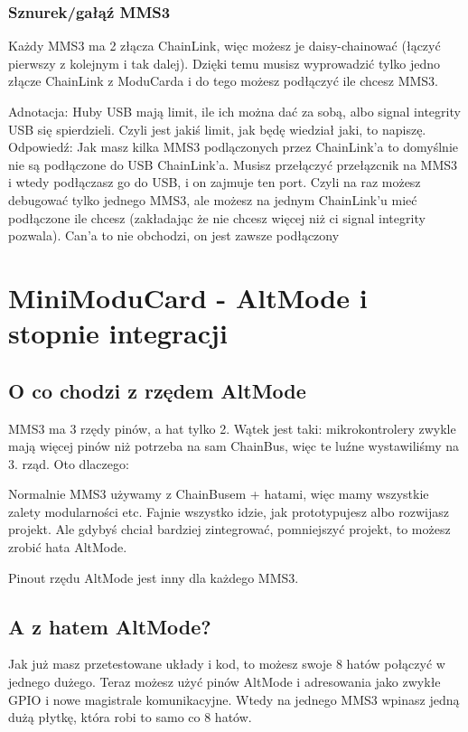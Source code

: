 \documentclass[b5paper, 10pt, twoside]{book}
\begin{document}
\subsubsection{Sznurek/gałąź MMS3}
Każdy MMS3 ma 2 złącza ChainLink, więc możesz je daisy-chainować (łączyć pierwszy z kolejnym i tak dalej). Dzięki temu musisz wyprowadzić tylko jedno złącze ChainLink z ModuCarda i do tego możesz podłączyć ile chcesz MMS3.

Adnotacja: Huby USB mają limit, ile ich można dać za sobą, albo signal integrity USB się spierdzieli. Czyli jest jakiś limit, jak będę wiedział jaki, to napiszę.
Odpowiedź: Jak masz kilka MMS3 podlączonych przez ChainLink'a to domyślnie nie są podłączone do USB ChainLink'a. Musisz przełączyć przełązcnik na MMS3 i wtedy podłączasz go do USB, i on zajmuje ten port. Czyli na raz możesz debugować tylko jednego MMS3, ale możesz na jednym ChainLink'u mieć podłączone ile chcesz (zakładając że nie chcesz więcej niż ci signal integrity pozwala). Can'a to nie obchodzi, on jest zawsze podłączony 

\section{MiniModuCard - AltMode i stopnie integracji} \label{AltMode}

\subsection{O co chodzi z rzędem AltMode}
MMS3 ma 3 rzędy pinów, a hat tylko 2. Wątek jest taki: mikrokontrolery zwykle mają więcej pinów niż potrzeba na sam ChainBus, więc te luźne wystawiliśmy na 3. rząd. Oto dlaczego:

Normalnie MMS3 używamy z ChainBusem + hatami, więc mamy wszystkie zalety modularności etc. Fajnie wszystko idzie, jak prototypujesz albo rozwijasz projekt. Ale gdybyś chciał bardziej zintegrować, pomniejszyć projekt, to możesz zrobić hata AltMode.

Pinout rzędu AltMode jest inny dla każdego MMS3.

\subsection{A z hatem AltMode?}
Jak już masz przetestowane układy i kod, to możesz swoje 8 hatów połączyć w jednego dużego. Teraz możesz użyć pinów AltMode i adresowania jako zwykłe GPIO i nowe magistrale komunikacyjne. Wtedy na jednego MMS3 wpinasz jedną dużą płytkę, która robi to samo co 8 hatów.
\end{document}
